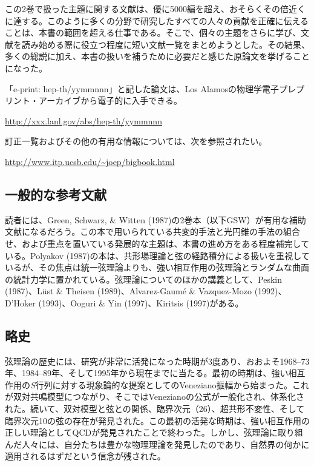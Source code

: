 \label{sec:references-guide}

この2巻で扱った主題に関する文献は、優に5000編を超え、おそらくその倍近くに達する。このように多くの分野で研究したすべての人々の貢献を正確に伝えることは、本書の範囲を超える仕事である。そこで、個々の主題をさらに学び、文献を読み始める際に役立つ程度に短い文献一覧をまとめようとした。その結果、多くの総説に加え、本書の扱いを補うために必要だと感じた原論文を挙げることになった。

「e-print: hep-th/yymmnnn」と記した論文は、Los Alamosの物理学電子プレプリント・アーカイブから電子的に入手できる。
\begin{center}
\url{http://xxx.lanl.gov/abs/hep-th/yymmnnn}
\end{center}
訂正一覧およびその他の有用な情報については、次を参照されたい。
\begin{center}
\url{http://www.itp.ucsb.edu/~joep/bigbook.html}
\end{center}

\subsection*{一般的な参考文献}
読者には、Green, Schwarz, \& Witten (1987)の2巻本（以下GSW）が有用な補助文献になるだろう。この本で用いられている共変的手法と光円錐の手法の組合せ、および重点を置いている発展的な主題は、本書の進め方をある程度補完している。Polyakov (1987)の本は、共形場理論と弦の経路積分による扱いを重視しているが、その焦点は統一弦理論よりも、強い相互作用の弦理論とランダムな曲面の統計力学に置かれている。弦理論についてのほかの講義として、Peskin (1987)、Lüst \& Theisen (1989)、Alvarez-Gaumé \& Vazquez-Mozo (1992)、D'Hoker (1993)、Ooguri \& Yin (1997)、Kiritsis (1997)がある。

\subsection*{略史}
弦理論の歴史には、研究が非常に活発になった時期が3度あり、おおよそ1968--73年、1984--89年、そして1995年から現在までに当たる。最初の時期は、強い相互作用の$S$行列に対する現象論的な提案としてのVeneziano振幅から始まった。これが双対共鳴模型につながり、そこではVenezianoの公式が一般化され、体系化された。続いて、双対模型と弦との関係、臨界次元（26）、超共形不変性、そして臨界次元10の弦の存在が発見された。この最初の活発な時期は、強い相互作用の正しい理論としてQCDが発見されたことで終わった。しかし、弦理論に取り組んだ人々には、自分たちは豊かな物理理論を発見したのであり、自然界の何かに適用されるはずだという信念が残された。


